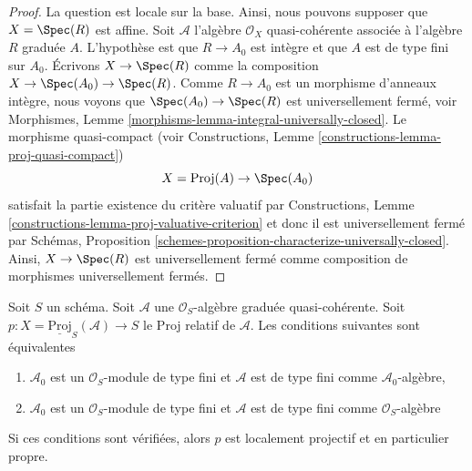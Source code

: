 \begin{proof}
La question est locale sur la base. Ainsi, nous pouvons supposer que  $X = \Spec(R)$ 
est affine. Soit  $\mathcal{A}$  l'algèbre  $\mathcal{O}_X$ quasi-cohérente associée à
l'algèbre  $R$ graduée  $A$. L'hypothèse est que  $R \to A_0$  est
intègre et que  $A$  est de type fini sur  $A_0$. Écrivons
 $X \to \Spec(R)$  comme la composition  $X \to \Spec(A_0) \to \Spec(R)$. Comme  $R \to A_0$  est un
morphisme d'anneaux intègre, nous voyons que  $\Spec(A_0) \to \Spec(R)$  est universellement
fermé, voir Morphismes, Lemme  \ref{morphisms-lemma-integral-universally-closed}. Le morphisme quasi-compact (voir
Constructions, Lemme  \ref{constructions-lemma-proj-quasi-compact})
$$
X = \text{Proj}(A) \to \Spec(A_0)
$$
satisfait la partie existence du critère valuatif par Constructions, Lemme
 \ref{constructions-lemma-proj-valuative-criterion}  et donc il est universellement fermé par Schémas, Proposition
 \ref{schemes-proposition-characterize-universally-closed}. Ainsi,  $X \to \Spec(R)$  est universellement fermé comme composition de
morphismes universellement fermés.
\end{proof}

\begin{lemma}
\label{lemma-relative-proj-proper}
Soit  $S$  un schéma. Soit  $\mathcal{A}$  une  $\mathcal{O}_S$-algèbre graduée
quasi-cohérente. Soit  $p : X = \underline{\text{Proj}}_S(\mathcal{A}) \to S$  le Proj relatif de  $\mathcal{A}$. Les conditions
suivantes sont équivalentes
\begin{enumerate}
\item $\mathcal{A}_0$  est un  $\mathcal{O}_S$-module de type fini et  $\mathcal{A}$  est de type
fini comme  $\mathcal{A}_0$-algèbre,
\item $\mathcal{A}_0$  est un  $\mathcal{O}_S$-module de type fini et  $\mathcal{A}$  est de type
fini comme  $\mathcal{O}_S$-algèbre
\end{enumerate}
Si ces conditions sont vérifiées, alors  $p$  est localement projectif et
en particulier propre.
\end{lemma}

